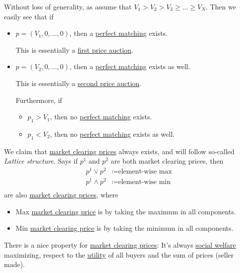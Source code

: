 Without loss of generality, as assume that \(V_{1}>V_{2}>V_{3}\geq \ldots \geq V_{N}\). Then we easily see that if
\begin{itemize}
	\item \(p = (V_{1}, 0, \ldots , 0 )\), then a \hyperref[def:perfect-matching]{perfect matching} exists.
	      \begin{note}
		      This is essentially a \hyperref[eg:first-price-auction]{first price auction}.
	      \end{note}
	\item \(p = (V_{2}, 0, \ldots , 0 )\), then a \hyperref[def:perfect-matching]{perfect matching} exists as well.
	      \begin{note}
		      This is essentially a \hyperref[eg:second-price-auction]{second price auction}.
	      \end{note}
	      Furthermore, if
	      \begin{itemize}
		      \item \(p_{1}>V_{1}\), then no \hyperref[def:perfect-matching]{perfect matching} exists.
		      \item \(p_{1}<V_{2}\), then no \hyperref[def:perfect-matching]{perfect matching} exists as well.
	      \end{itemize}
\end{itemize}

We claim that \hyperref[note:market-clearing-prices]{market clearing prices} always exists, and will follow so-called \emph{Lattice structure}. Says if
\(p^{1}\) and \(p^{2}\) are both market clearing prices, then
\[
	\begin{split}
		p^{1}\lor p^{2} &\coloneqq \text{element-wise max}\\
		p^{1}\land p^{2} &\coloneqq \text{element-wise min}\\
	\end{split}
\]
are also \hyperref[note:market-clearing-prices]{market clearing prices}, where
\begin{itemize}
	\item Max \hyperref[note:market-clearing-prices]{market clearing price} is by taking the maximum in all components.
	\item Min \hyperref[note:market-clearing-prices]{market clearing price} is by taking the minimum in all components.
\end{itemize}


\begin{remark}
	There is a nice property for \hyperref[note:market-clearing-prices]{market clearing prices}: It's always \hyperref[def:social-welfare]{social welfare}
	maximizing, respect to the \hyperref[def:reward]{utility} of all buyers and the sum of prices (seller made).
\end{remark}

